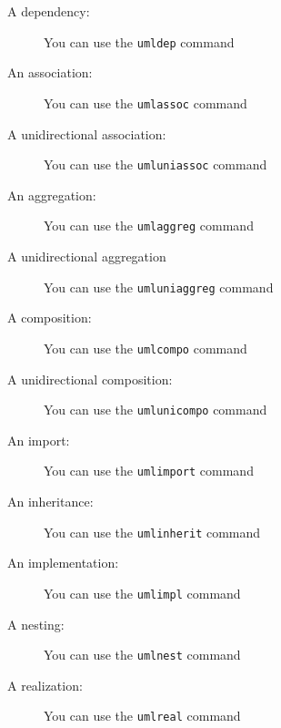 \documentclass[a4paper,11pt]{report}
\begin{document}
\begin{description}
	\item[A dependency:] You can use the {\tt umldep} command
	      \begin{center}
	      \end{center}
	\item[An association:] You can use the {\tt umlassoc} command
	      \begin{center}
	      \end{center}
	\item[A unidirectional association:] You can use the {\tt umluniassoc} command
	      \begin{center}
	      \end{center}
	\item[An aggregation:] You can use the {\tt umlaggreg} command
	      \begin{center}
	      \end{center}
	\item[A unidirectional aggregation ] You can use the {\tt umluniaggreg} command
	      \begin{center}
	      \end{center}
	\item[A composition:] You can use the {\tt umlcompo} command
	      \begin{center}
	      \end{center}
	\item[A unidirectional composition:] You can use the {\tt umlunicompo} command
	      \begin{center}
	      \end{center}
	\item[An import:] You can use the {\tt umlimport} command
	      \begin{center}
	      \end{center}
	\item[An inheritance:] You can use the {\tt umlinherit} command
	      \begin{center}
	      \end{center}
	\item[An implementation:] You can use the {\tt umlimpl} command
	      \begin{center}
	      \end{center}
	\item[A nesting:] You can use the {\tt umlnest} command
	      \begin{center}
	      \end{center}
	\item[A realization:] You can use the {\tt umlreal} command
	      \begin{center}
	      \end{center}
\end{description}
\end{document}

